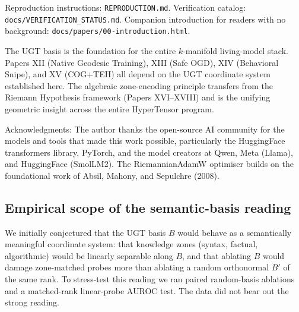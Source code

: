 \documentclass[11pt]{article}
\begin{document}
Reproduction instructions: \texttt{REPRODUCTION.md}. Verification catalog: \texttt{docs/VERIFICATION\_STATUS.md}. Companion introduction for readers with no background: \texttt{docs/papers/00-introduction.html}.

The UGT basis is the foundation for the entire $k$-manifold living-model stack. Papers XII (Native Geodesic Training), XIII (Safe OGD), XIV (Behavioral Snipe), and XV (COG+TEH) all depend on the UGT coordinate system established here. The algebraic zone-encoding principle transfers from the Riemann Hypothesis framework (Papers XVI--XVIII) and is the unifying geometric insight across the entire HyperTensor program.

Acknowledgments: The author thanks the open-source AI community for the models and tools that made this work possible, particularly the HuggingFace transformers library, PyTorch, and the model creators at Qwen, Meta (Llama), and HuggingFace (SmolLM2). The RiemannianAdamW optimiser builds on the foundational work of Absil, Mahony, and Sepulchre (2008).

\subsection{Empirical scope of the semantic-basis reading}
\label{sec:ugt-falsification}

We initially conjectured that the UGT basis $B$ would behave as a
semantically meaningful coordinate system: that knowledge zones
(syntax, factual, algorithmic) would be linearly separable along $B$,
and that ablating $B$ would damage zone-matched probes more than
ablating a random orthonormal $B'$ of the same rank. To stress-test
this reading we ran paired random-basis ablations and a matched-rank
linear-probe AUROC test. The data did not bear out the strong reading.
\end{document}
